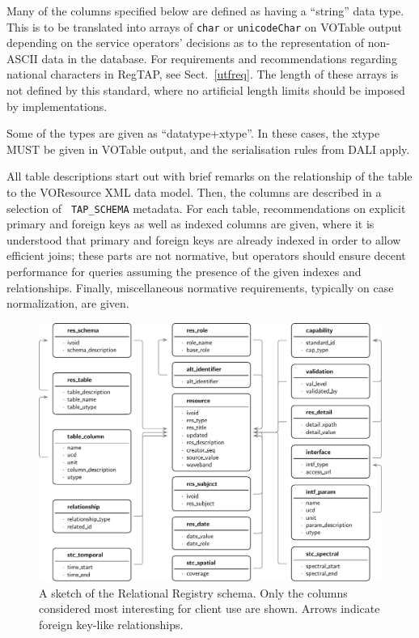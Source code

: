 \documentclass[11pt,a4paper]{ivoa}
\newcommand{\tapent}[1]{\texttt{\color{tapcolor} #1}}
\begin{document}
Many of the columns specified below are defined as having a ``string''
data type.  This is to be translated into arrays of \texttt{char} or
\texttt{unicodeChar} on VOTable output depending on the service
operators' decisions as to the representation of non-ASCII data in the
database.  For requirements and recommendations regarding national
characters in RegTAP, see Sect.~\ref{utfreq}.  The length of these
arrays is not defined by this standard, where no artificial
length limits should be imposed by implementations.

Some of the types are given as ``datatype+xtype''.  In these cases, the
xtype MUST be given in VOTable output, and the serialisation rules from
DALI \citep{2017ivoa.spec.0517D} apply.

All table descriptions start out with brief remarks on the
relationship of the table to the VOResource XML data model.  Then, the
columns are described in a selection of \tapent{TAP\_SCHEMA} metadata. For each
table, recommendations on explicit primary and foreign keys as well as
indexed columns are given, where it is understood that primary and
foreign keys are already indexed in order to allow efficient joins;
these parts are not normative, but operators should ensure decent
performance for queries assuming the presence of the given indexes and
relationships.  Finally, miscellaneous normative requirements, typically
on case normalization, are given.


\begin{figure}

\includegraphics[width=\textwidth]{schema.pdf}
\caption{A sketch of the
Relational Registry schema.
Only the columns considered
most interesting for client use are shown.  Arrows indicate foreign
key-like relationships.}
\end{figure}
\end{document}
